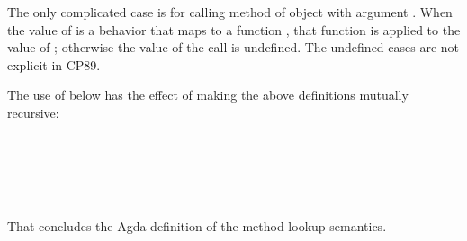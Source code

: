 \begin{AgdaAlign}
\begin{code}
\AgdaSpace{}%
\AgdaSpace{}%
\AgdaSpace{}%
\AgdaSpace{}%
\AgdaSymbol{(}\AgdaSpace{}%
\AgdaSymbol{(}\AgdaSpace{}%
\AgdaSpace{}%
\AgdaSpace{}%
\AgdaSpace{}%
\AgdaSymbol{)}\AgdaSpace{}%
\AgdaSymbol{)}\<%
\end{code}
%
The only complicated case is for calling method  of object  
with argument .
When the value of  is a behavior  that maps  to a function ,
that function is applied to the value of ;
otherwise the value of the call is undefined.
The undefined cases are not explicit in CP89.

The use of  below has the effect of making the above definitions mutually recursive:
%
\begin{code}%
%
\>[4]\AgdaSpace{}%
\AgdaSymbol{:}\AgdaSpace{}%
\AgdaSpace{}%
\AgdaSpace{}%
\AgdaSpace{}%
\AgdaSpace{}%
\AgdaSpace{}%
\AgdaSpace{}%
\<%
\\
%
\>[4]\AgdaSpace{}%
\AgdaSymbol{=}\AgdaSpace{}%
\AgdaSpace{}%
\AgdaSpace{}%
\AgdaSpace{}%
\AgdaSpace{}%
\<%
\\
%
\>[4]%
\>[13]\AgdaSymbol{=}\AgdaSpace{}%
\AgdaSpace{}%
\AgdaSymbol{(}\AgdaSpace{}%
\AgdaSymbol{(}\AgdaSpace{}%
\AgdaSymbol{))}\<%
\\
%
\>[4]%
\>[13]\AgdaSymbol{=}\AgdaSpace{}%
\AgdaSpace{}%
\AgdaSymbol{(}\AgdaSpace{}%
\AgdaSymbol{(}\AgdaSpace{}%
\AgdaSymbol{(}\AgdaSpace{}%
\AgdaSymbol{)))}\<%
\\
%
\>[4]%
\>[13]\AgdaSymbol{=}\AgdaSpace{}%
\AgdaSpace{}%
\AgdaSymbol{(}\AgdaSpace{}%
\AgdaSymbol{(}\AgdaSpace{}%
\AgdaSymbol{(}\AgdaSpace{}%
\AgdaSymbol{)))}\<%
\end{code}
%
That concludes the Agda definition of the method lookup semantics.


\end{AgdaAlign}
